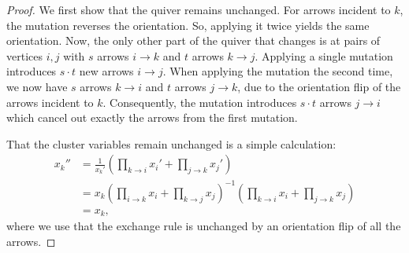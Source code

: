 \begin{proof}
	We first show that the quiver remains unchanged. For arrows incident to $k$, the
	mutation reverses the orientation. So, applying it twice yields the same orientation.
	Now, the only other part of the quiver that changes is at pairs of vertices $i,j$ with
	$s$ arrows $i \to k$ and $t$ arrows $k \to j$. Applying a single mutation introduces
	$s\cdot t$ new arrows $i \to j$. When applying the mutation the second time, we now
	have $s$ arrows $k \to i$ and $t$ arrows $j \to k$, due to the orientation flip of the
	arrows incident to $k$. Consequently, the mutation introduces $s \cdot t$ arrows $j \to
		i$ which cancel out exactly the arrows from the first mutation.

	That the cluster variables remain unchanged is a simple calculation:
	\begin{align*}
		x_k''
		 & = \frac{1}{x_k'}\left(\prod_{k \to i}x_i' + \prod_{j \to k} x_j'\right)                                                \\
		 & = x_k \left(\prod_{i \to k} x_i + \prod_{k \to j}x_j\right)^{-1} \left(\prod_{k \to i}x_i + \prod_{j \to k} x_j\right) \\
		 & = x_k,
	\end{align*}
	where we use that the exchange rule is unchanged by an orientation flip of all the arrows.
\end{proof}

